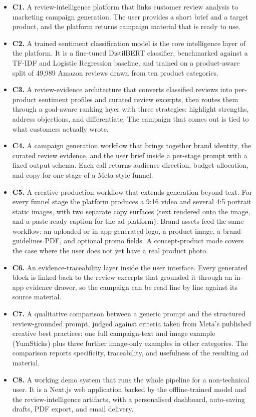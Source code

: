 \documentclass[12pt,a4paper]{report}
\begin{document}
\begin{itemize}
  \item \textbf{C1.} A review-intelligence platform that links customer review analysis to marketing campaign generation. The user provides a short brief and a target product, and the platform returns campaign material that is ready to use.
  \item \textbf{C2.} A trained sentiment classification model is the core intelligence layer of the platform. It is a fine-tuned DistilBERT classifier, benchmarked against a TF-IDF and Logistic Regression baseline, and trained on a product-aware split of 49,989 Amazon reviews drawn from ten product categories.
  \item \textbf{C3.} A review-evidence architecture that converts classified reviews into per-product sentiment profiles and curated review excerpts, then routes them through a goal-aware ranking layer with three strategies: highlight strengths, address objections, and differentiate. The campaign that comes out is tied to what customers actually wrote.
  \item \textbf{C4.} A campaign generation workflow that brings together brand identity, the curated review evidence, and the user brief inside a per-stage prompt with a fixed output schema. Each call returns audience direction, budget allocation, and copy for one stage of a Meta-style funnel.
  \item \textbf{C5.} A creative production workflow that extends generation beyond text. For every funnel stage the platform produces a 9:16 video and several 4:5 portrait static images, with two separate copy surfaces (text rendered onto the image, and a paste-ready caption for the ad platform). Brand assets feed the same workflow: an uploaded or in-app generated logo, a product image, a brand-guidelines PDF, and optional promo fields. A concept-product mode covers the case where the user does not yet have a real product photo.
  \item \textbf{C6.} An evidence-traceability layer inside the user interface. Every generated block is linked back to the review excerpts that grounded it through an in-app evidence drawer, so the campaign can be read line by line against its source material.
  \item \textbf{C7.} A qualitative comparison between a generic prompt and the structured review-grounded prompt, judged against criteria taken from Meta's published creative best practices: one full campaign-text and image example (YumSticks) plus three further image-only examples in other categories. The comparison reports specificity, traceability, and usefulness of the resulting ad material.
  \item \textbf{C8.} A working demo system that runs the whole pipeline for a non-technical user. It is a Next.js web application backed by the offline-trained model and the review-intelligence artifacts, with a personalised dashboard, auto-saving drafts, PDF export, and email delivery.
\end{itemize}
\end{document}
